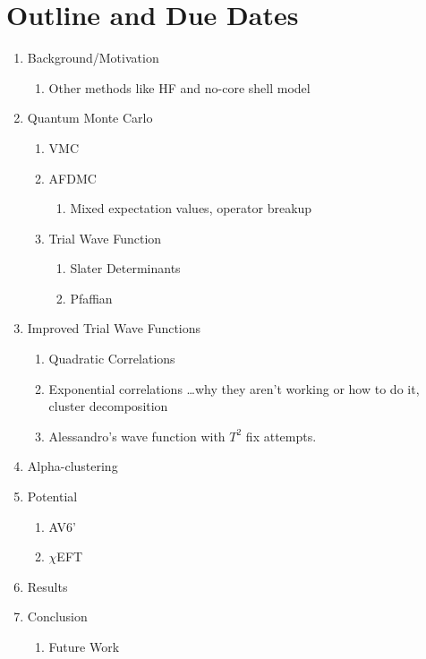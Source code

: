{\small
\section*{Outline and Due Dates}
\begin{enumerate}
   \item Background/Motivation 
   \begin{enumerate}
      \item Other methods like HF and no-core shell model
   \end{enumerate}
   \item Quantum Monte Carlo
   \begin{enumerate}
      \item VMC 
      \item AFDMC 
      \begin{enumerate}
         \item Mixed expectation values, operator breakup
      \end{enumerate}
      \item Trial Wave Function 
      \begin{enumerate}
         \item Slater Determinants
         \item Pfaffian
      \end{enumerate}
   \end{enumerate}
   \item Improved Trial Wave Functions
   \begin{enumerate}
      \item Quadratic Correlations 
      \item Exponential correlations \ldots why they aren't working or how to do it, cluster decomposition 
      \item Alessandro's wave function with $T^2$ fix attempts. 
   \end{enumerate}
   \item Alpha-clustering 
   \item Potential
   \begin{enumerate}
      \item AV6' 
      \item $\chi$EFT 
   \end{enumerate}
   \item Results 
   \item Conclusion 
   \begin{enumerate}
      \item Future Work 
   \end{enumerate}
\end{enumerate}
}
